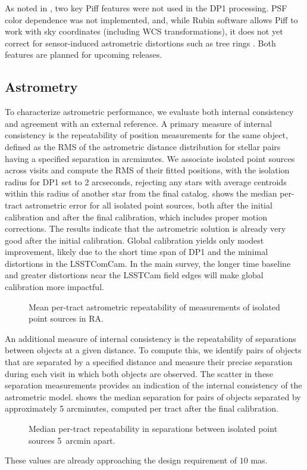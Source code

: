 As noted in  \cite{PSTN-019}, two key Piff features were not used in the DP1 processing.
PSF color dependence was not implemented, and, while Rubin software allows Piff to work with sky coordinates (including WCS transformations), 
it does not yet correct for sensor-induced astrometric distortions such as tree rings \citep{2017JInst..12C5015P}.
Both features are planned for upcoming releases.

\subsection{Astrometry}
To characterize astrometric performance, we evaluate both internal consistency and agreement with an external reference.
A primary measure of internal consistency is the repeatability of position measurements for the same object, defined as the RMS of the astrometric distance distribution for stellar pairs having a specified separation in arcminutes. 
We associate isolated point sources across visits and compute the RMS of their fitted positions, with the isolation radius for DP1 set to 2 arcseconds, rejecting any stars with average centroids within this radius of another star from the final catalog.
 shows the median per-\gls{tract} astrometric error for all isolated point sources, both after the initial calibration and after the final calibration, which includes proper motion corrections.
The results indicate that the astrometric solution is already very good after the initial \gls{calibration}.
Global calibration yields only modest improvement, likely due to the short time span of \gls{DP1} and the minimal distortions in the LSSTComCam.
In the main survey, the longer time baseline and greater distortions near the \gls{LSSTCam} field edges will make global calibration more impactful.
\begin{figure}[htb!]
\caption{Mean per-tract astrometric repeatability of measurements of isolated point sources in RA.}
\label{fig:dmAstroErr}
\end{figure}

An additional measure of internal consistency is the repeatability of separations between objects at a given distance.
To compute this, we identify pairs of objects that are separated by a specified distance and measure their precise separation during each visit in which both objects are observed.
The scatter in these separation measurements provides an indication of the internal consistency of the astrometric model.
 shows the median separation for pairs of objects separated by approximately 5 arcminutes, computed per tract after the final calibration.
 \begin{figure}[htb!]
 \caption{Median per-tract repeatability in separations between isolated point sources 5~arcmin apart.}
 \label{fig:AM1}
 \end{figure}
These values are already approaching the design requirement of $10$ mas.

